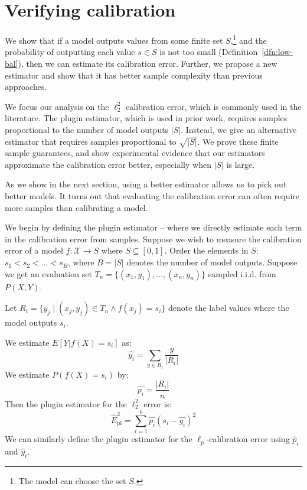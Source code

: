 \section{Verifying calibration}
\label{sec:verifying_calibration}

We show that if a model outputs values from some finite set $S$,\footnote{The model can choose the set $S$.} and the probability of outputting each value $s \in S$ is not too small (Definition~\ref{dfn:low-bal}), then we can estimate its calibration error. Further, we propose a new estimator and show that it has better sample complexity than previous approaches.

We focus our analysis on the $\ell_2^2$ calibration error, which is commonly used in the literature. The plugin estimator, which is used in prior work, requires samples proportional to the number of model outputs $|S|$. Instead, we give an alternative estimator that requires samples proportional to $\sqrt{|S|}$. We prove these finite sample guarantees, and show experimental evidence that our estimators approximate the calibration error better, especially when $|S|$ is large.

As we show in the next section, using a better estimator allows us to pick out better models. It turns out that evaluating the calibration error can often require more samples than calibrating a model. 

We begin by defining the plugin estimator -- where we directly estimate each term in the calibration error from samples. Suppose we wish to measure the calibration error of a model $f : \mathcal{X} \to S$ where $S \subseteq [0, 1]$. Order the elements in $S$: $s_1 < s_2 < \dots < s_B$, where $B = |S|$ denotes the number of model outputs. Suppose we get an evaluation set $T_n = \{(x_1, y_1), \dots, (x_n, y_n)\}$ sampled i.i.d. from $P(X, Y)$.

\begin{definition}
Let $R_i = \{ y_j \; | \; (x_j, y_j) \in T_n\wedge f(x_j) = s_i \}$ denote the label values where the model outputs $s_i$.

We estimate $E[Y | f(X) = s_i]$ as:
\[ \hat{y_i} = \sum_{y \in R_i} \frac{y}{|R_i|} \] 
We estimate $P(f(X) = s_i)$ by:
\[ \hat{p_i} = \frac{|R_i|}{n} \]
Then the plugin estimator for the $\ell_2^2$ error is:
\[ \hat{E}_{\mbox{pl}}^2 = \sum_{i=1}^b \hat{p_i} (s_i - \hat{y_i})^2 \]
We can similarly define the plugin estimator for the $\ell_p$-calibration error using $\hat{p}_i$ and $\hat{y}_i$.
\end{definition}

